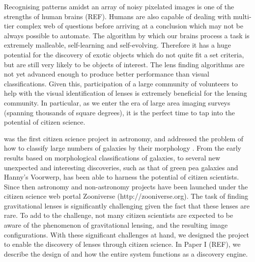 \documentclass[useAMS,usenatbib,a4paper]{mn2e}
\begin{document}
Recognising patterns amidst an array of noisy pixelated images is one of the
strengths of human brains (REF). Humans are also capable of dealing with
multi-tier complex web of questions before arriving at a conclusion which may
not be always possible to automate. The algorithm by which our brains process a
task is extremely malleable, self-learning and self-evolving. Therefore it has
a huge potential for the discovery of exotic objects which do not quite fit a
set criteria, but are still very likely to be objects of interest. The lens
finding algorithms are not yet advanced enough to produce better performance
than visual classifications. Given this, participation of a large community of
volunteers to help with the visual identification of lenses is extremely
beneficial for the lensing community. In particular, as we enter the era of
large area imaging surveys (spanning thousands of square degrees), it is
the perfect time to tap into the potential of citizen science.

\GZ was the first citizen science project in astronomy, and addressed the
problem of how to  classify large numbers of galaxies by their morphology
\citep{Lintott2008}.  From the early results based on morphological
classifications of galaxies, to several new unexpected and interesting
discoveries, such as that of green pea galaxies and Hanny's Voorwerp, \GZ
has been able to harness the potential of citizen scientists.  Since then
astronomy and non-astronomy projects have been launched under the citizen
science web portal Zooniverse (http://zooniverse.org). The task of finding
gravitational lenses is significantly challenging given the fact that these
lenses are rare. To add to the challenge, not many citizen scientists are
expected to be aware of the phenomenon of gravitational lensing, and the
resulting image configurations.  With these significant challenges at hand, we
designed the \sw project to enable the discovery of lenses through citizen
science.  In Paper I (REF), we describe the design of \sw and how the entire
system functions as a discovery engine.
\end{document}
